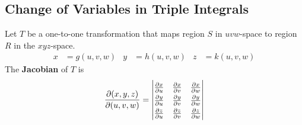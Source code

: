 \documentclass[../Calculus \Roman{3}.tex]{subfiles}
\begin{document}
			\subsection*{Change of Variables in Triple Integrals}
				Let $T$ be a one-to-one transformation that maps region $S$ in  $uvw$-space to region $R$ in the $xyz$-space.
					\begin{align*}
						x &= g(u, v, w) &
								y &= h(u, v, w) &
								z &= k(u, v, w)
					\end{align*}
					The \textbf{Jacobian} of $T$ is
						\[
							\def\arraystretch{1.3}
							\pder{(x, y, z)}{(u, v, w)} = 
								\begin{vmatrix}
									\pder{x}{u} & \pder{x}{v} & \pder{x}{w} \\
									\pder{y}{u} & \pder{y}{v} & \pder{y}{w} \\
									\pder{z}{u} & \pder{z}{v} & \pder{z}{w}
								\end{vmatrix}
						\]
\end{document}
